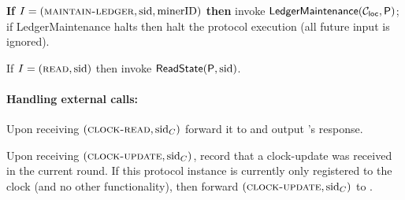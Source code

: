 \begin{cccProtocol}
\begin{cccItemize}[nosep]
        \item \textbf{If} $I = (\textsc{maintain-ledger}, \mathrm{sid}, \mathrm{minerID})$ \textbf{then} invoke $\mathsf{LedgerMaintenance}(\mathcal{C}_{\mathsf{loc}}, \mathsf{P})$; if \textsf{LedgerMaintenance} halts then halt the protocol execution (all future input is ignored).

        \item If $I = (\textsc{read}, \mathrm{sid})$ then invoke $\mathsf{ReadState}(\mathsf{P}, \mathrm{sid})$.
    \end{cccItemize}

    \paragraph{Handling external calls:}
    \begin{cccItemize}[nosep]
        \item Upon receiving $(\textsc{clock-read}, \mathrm{sid}_C)$ forward it to \funcClock and output \funcClock's response.
        \item Upon receiving $(\textsc{clock-update}, \mathrm{sid}_C)$, record that a clock-update was received in the current round.
        If this protocol instance is currently only registered to the clock (and no other functionality), then forward $(\textsc{clock-update}, \mathrm{sid}_C)$ to \funcClock.
    \end{cccItemize}
\end{cccProtocol}